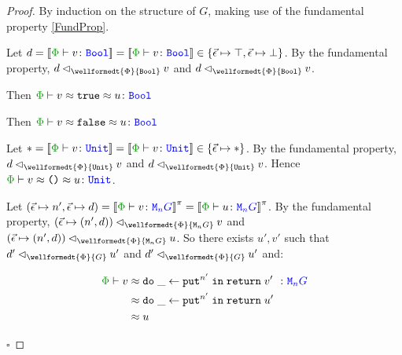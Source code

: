 \documentclass{Report}
\newcommand\eLogRel[4]{\logRel{#2}{\wellformedt{#1}{#3}}{#4}}
\newcommand\peLogRel[3]{\eLogRel{\P}{#1}{#2}{#3}}
\newcommand{\zptyperelation}[2]{\typerelation{\P}{#1}{#2}}
\newcommand{\zpberelation}[2]{\berelation{\P}{#1}{#2}}
\newcommand\liftp[0]{^\pi}
\begin{document}
\begin{proof}
    By induction on the structure of $G$, making use of the fundamental property \ref{FundProp}.

    Let $d=\deno{\zptyperelation{v}{\B}}=\deno{\zptyperelation{v}{\B}}\in \{\ev\mapsto \top, \ev\mapsto\bot\}$. By the fundamental property, $\peLogRel{d}{\B}{v}$  and $\peLogRel{d}{\B}{v}$.

    Then $\zpberelation{v\beequiv\t}{u}{\B}$

    
    Then $\zpberelation{v\beequiv\f}{u}{\B}$

    Let $\singleton=\deno{\zptyperelation{v}{\U}}=\deno{\zptyperelation{v}{\U}}\in \{\ev\mapsto\singleton\}$. By the fundamental property, $\peLogRel{d}{\U}{v}$  and $\peLogRel{d}{\U}{v}$. Hence $\zpberelation{v\beequiv\u}{u}{\U}$.

    \case{\teffect}

    Let $(\ev\mapsto n', \ev\mapsto d) = \deno{\zptyperelation{v}{\M{n}{G}}}\liftp = \deno{\zptyperelation{u}{\M{n}{G}}}\liftp$. By the fundamental property, $\peLogRel{(\ev\mapsto(n', d))}{\M{n}{G}}{v}$ and $\peLogRel{(\ev\mapsto(n', d))}{\M{n}{G}}{u}$. So there exists $u', v'$ such that $\peLogRel{d'}{G}{u'}$ and $\peLogRel{d'}{G}{u'}$ and:

    \begin{align*}
        \zpberelation{v&}{\doin{\_}{\put^{n'}}{\return{v'}}}{\M{n}{G}}\\
        &\beequiv \doin{\_}{\put^{n'}}{\return{u'}}\\
        & \beequiv u
    \end{align*}

$\square$
\end{proof}
\end{document}
